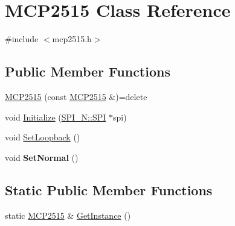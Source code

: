 \hypertarget{class_m_c_p2515}{\section{M\-C\-P2515 Class Reference}
\label{class_m_c_p2515}
}


{\ttfamily \#include $<$mcp2515.\-h$>$}

\subsection*{Public Member Functions}
\begin{DoxyCompactItemize}
\item 
\hyperlink{class_m_c_p2515_a8cd4111604b740feb758bd4d077f4fb8}{M\-C\-P2515} (const \hyperlink{class_m_c_p2515}{M\-C\-P2515} \&)=delete
\item 
void \hyperlink{class_m_c_p2515_a41921933b4f2595e8935f8432dd8d65b}{Initialize} (\hyperlink{class_s_p_i___n_1_1_s_p_i}{S\-P\-I\-\_\-\-N\-::\-S\-P\-I} $\ast$spi)
\item 
void \hyperlink{class_m_c_p2515_a7aac5fdb713b83933391348f1188f2b9}{Set\-Loopback} ()
\item 
\hypertarget{class_m_c_p2515_a58601a9d30863ebac441d641ddfac44e}{void {\bfseries Set\-Normal} ()}\label{class_m_c_p2515_a58601a9d30863ebac441d641ddfac44e}

\end{DoxyCompactItemize}
\subsection*{Static Public Member Functions}
\begin{DoxyCompactItemize}
\item 
static \hyperlink{class_m_c_p2515}{M\-C\-P2515} \& \hyperlink{class_m_c_p2515_a3f53839a9258086fd21e2fc4190de60d}{Get\-Instance} ()
\end{DoxyCompactItemize}
